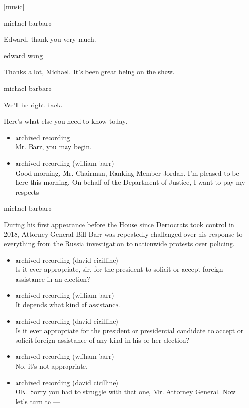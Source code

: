 {[}music{]}

michael barbaro

Edward, thank you very much.

edward wong

Thanks a lot, Michael. It's been great being on the show.

michael barbaro

We'll be right back.

Here's what else you need to know today.

\begin{itemize}
\item
  archived recording\\
  Mr. Barr, you may begin.
\item
  archived recording (william barr)\\
  Good morning, Mr. Chairman, Ranking Member Jordan. I'm pleased to be
  here this morning. On behalf of the Department of Justice, I want to
  pay my respects ---
\end{itemize}

michael barbaro

During his first appearance before the House since Democrats took
control in 2018, Attorney General Bill Barr was repeatedly challenged
over his response to everything from the Russia investigation to
nationwide protests over policing.

\begin{itemize}
\item
  archived recording (david cicilline)\\
  Is it ever appropriate, sir, for the president to solicit or accept
  foreign assistance in an election?
\item
  archived recording (william barr)\\
  It depends what kind of assistance.
\item
  archived recording (david cicilline)\\
  Is it ever appropriate for the president or presidential candidate to
  accept or solicit foreign assistance of any kind in his or her
  election?
\item
  archived recording (william barr)\\
  No, it's not appropriate.
\item
  archived recording (david cicilline)\\
  OK. Sorry you had to struggle with that one, Mr. Attorney General. Now
  let's turn to ---
\end{itemize}

